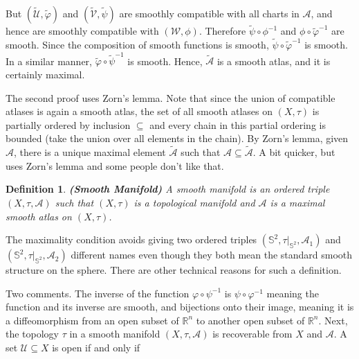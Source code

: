 \documentclass{article}
\theoremstyle{plain}
\theoremstyle{normal}
\newtheorem{definition}{Definition}[section]
\begin{document}
        But $(\tilde{\mathcal{U}},\tilde{\varphi})$ and
        $(\tilde{\mathcal{V}},\tilde{\psi})$ are smoothly compatible with all
        charts in $\mathcal{A}$, and hence are smoothly compatible with
        $(\mathcal{W},\phi)$. Therefore
        $\tilde{\psi}\circ\phi^{-1}$ and $\phi\circ\tilde{\varphi}^{-1}$ are
        smooth. Since the composition of smooth functions is smooth,
        $\tilde{\psi}\circ\tilde{\varphi}^{-1}$ is smooth. In a similar manner,
        $\tilde{\varphi}\circ\tilde{\psi}^{-1}$ is smooth. Hence,
        $\tilde{\mathcal{A}}$ is a smooth atlas, and it is certainly maximal.
        \par\hfill\par
        The second proof uses Zorn's lemma. Note that since the union of
        compatible atlases is again a smooth atlas, the set of all smooth
        atlases on $(X,\tau)$ is partially ordered by inclusion $\subseteq$
        and every chain in this partial ordering is bounded (take the union
        over all elements in the chain). By Zorn's lemma, given $\mathcal{A}$,
        there is a unique maximal element $\tilde{\mathcal{A}}$ such that
        $\mathcal{A}\subseteq\tilde{\mathcal{A}}$. A bit quicker, but uses
        Zorn's lemma and some people don't like that.
        \begin{definition}{\textbf{(Smooth Manifold)}}
            A smooth manifold is an ordered triple $(X,\tau,\mathcal{A})$
            such that $(X,\tau)$ is a topological manifold and $\mathcal{A}$
            is a maximal smooth atlas on $(X,\tau)$.
        \end{definition}
        The maximality condition avoids giving two ordered triples
        $(\mathbb{S}^{2},\tau|_{\mathbb{S}^{2}},\mathcal{A}_{1})$ and
        $(\mathbb{S}^{2},\tau|_{\mathbb{S}^{2}},\mathcal{A}_{2})$ different
        names even though they both mean the standard smooth structure on the
        sphere. There are other technical reasons for such a definition.
        \par\hfill\par
        Two comments. The inverse of the function $\varphi\circ\psi^{-1}$
        is $\psi\circ\varphi^{-1}$ meaning the function and its inverse are
        smooth, and bijections onto their image, meaning it is a
        diffeomorphism from an open subset of $\mathbb{R}^{n}$ to another open
        subset of $\mathbb{R}^{n}$. Next, the topology $\tau$ in a smooth
        manifold $(X,\tau,\mathcal{A})$ is recoverable from $X$ and
        $\mathcal{A}$. A set $\mathcal{U}\subseteq{X}$ is open if and only if
\end{document}
